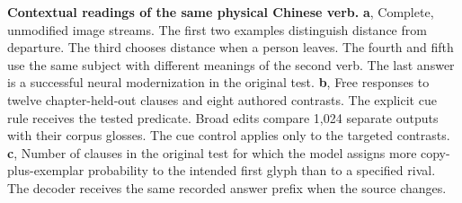 \textbf{Contextual readings of the same physical Chinese verb.} \textbf{a}, Complete, unmodified image streams. The first two examples distinguish distance from departure. The third chooses distance when a person leaves. The fourth and fifth use the same subject with different meanings of the second verb. The last answer is a successful neural modernization in the original test. \textbf{b}, Free responses to twelve chapter-held-out clauses and eight authored contrasts. The explicit cue rule receives the tested predicate. Broad edits compare 1,024 separate outputs with their corpus glosses. The cue control applies only to the targeted contrasts. \textbf{c}, Number of clauses in the original test for which the model assigns more copy-plus-exemplar probability to the intended first glyph than to a specified rival. The decoder receives the same recorded answer prefix when the source changes.
